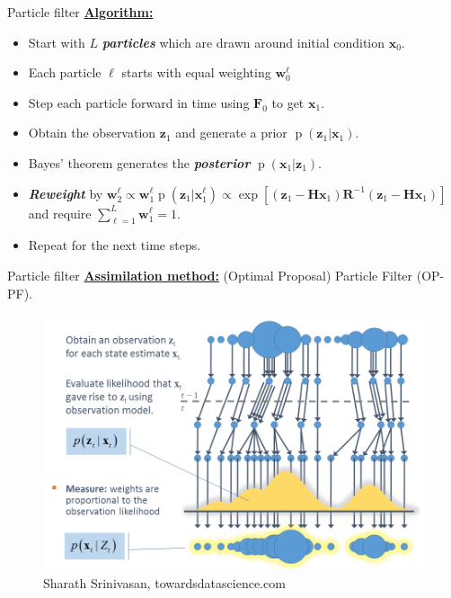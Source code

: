 \documentclass[aspectratio=169]{beamer}
\newcommand\boldgreen[1]{\textcolor{lighter_csu_green}{\emph{\textbf{#1}}}}
\newcommand{\state}{\boldsymbol{x}}
\newcommand{\observation}{\boldsymbol{z}}
\newcommand{\obsop}{\boldsymbol{H}}
\newcommand{\observationcovariance}{\boldsymbol{R}}
\newcommand{\modelf}{\boldsymbol{F}}
\newcommand{\weights}{\boldsymbol{w}}
\newcommand{\prob}{\operatorname{p}}
\begin{document}
\begin{frame}{Particle filter}
\vfill
\textbf{\underline{Algorithm:}}
    \begin{itemize}
        \item Start with $L$ \boldgreen{particles} which are drawn around initial condition $\state_0$.
        \item Each particle $\ell$ starts with equal weighting $\weights^\ell_0$
        \item Step each particle forward in time using $\modelf_0$ to get $\state_1$. 
        \item Obtain the observation $\observation_1$ and generate a prior $\prob(\observation_1 | \state_1)$.
        \item Bayes' theorem generates the \boldgreen{posterior} $\prob(\state_1|\observation_1)$.
        \item \boldgreen{Reweight} by $\weights^\ell_{2} \propto \weights_{1}^\ell \prob(\observation_1 | \state_1^\ell ) \propto \exp[(\observation_1 - \obsop \state_1) \observationcovariance^{-1} (\observation_1 - \obsop \state_1)]$ and require $\sum_{\ell = 1}^L \weights^\ell_{1} = 1.$
        \item Repeat for the next time steps.
    \end{itemize}
\vfill
\end{frame}



\begin{frame}{Particle filter}
    \textbf{\underline{Assimilation method:}} (Optimal Proposal) Particle Filter (OP-PF).
\begin{figure}[H]
    \centering
    \includegraphics[width=.65\textwidth]{figures/particle_filter_flowchart.png}
    \caption{Sharath Srinivasan, towardsdatascience.com}
\end{figure}
\vfill
\end{frame}
\end{document}
